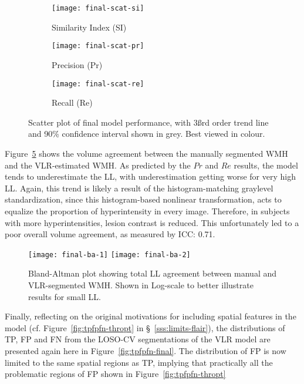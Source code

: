 \begin{figure}
  \centering
  \begin{subfigure}{0.32\textwidth}
    \centering
    \texttt{[image: final-scat-si]}
    \caption{Similarity Index (SI)}%
    \label{fig:seg-final-scat-si}
  \end{subfigure}
  \begin{subfigure}{0.32\textwidth}
    \centering
    \texttt{[image: final-scat-pr]}
    \caption{Precision (Pr)}%
    \label{fig:seg-final-scat-pr}
  \end{subfigure}
  \begin{subfigure}{0.32\textwidth}
    \centering
    \texttt{[image: final-scat-re]}
    \caption{Recall (Re)}%
    \label{fig:seg-final-scat-re}
  \end{subfigure}
  \caption{Scatter plot of final model performance, with 3\ss{rd} order trend line
    and 90\% confidence interval shown in grey. Best viewed in colour.}%
  \label{fig:seg-final-scat}
\end{figure}
Figure~\ref{fig:ba-final} shows the volume agreement between
the manually segmented WMH and the VLR-estimated WMH.
As predicted by the $Pr$ and $Re$ results, %
the model tends to underestimate the LL,
with underestimation getting worse for very high LL.
Again, this trend is likely a result of the histogram-matching graylevel standardization,
since this histogram-based nonlinear transformation,
acts to equalize the proportion of hyperintensity in every image.
Therefore, in subjects with more hyperintensities, lesion contrast is reduced.
This unfortunately led to a poor overall volume agreement, as measured by ICC: 0.71.
\par
\begin{figure}
  \centering
  \texttt{[image: final-ba-1]}
  \texttt{[image: final-ba-2]}
  \caption{Bland-Altman plot showing total LL agreement between manual and VLR-segmented WMH.
    Shown in Log-scale to better illustrate results for small LL.}%
  \label{fig:ba-final}
\end{figure}
Finally, reflecting on the original motivations for including spatial features in the model
(cf. Figure~\ref{fig:tpfpfn-thropt} in \S~\ref{sss:limits-flair}),
the distributions of TP, FP and FN from the LOSO-CV segmentations of the VLR model
are presented again here in Figure~\ref{fig:tpfpfn-final}.
The distribution of FP is now limited to the same spatial regions as TP,
implying that practically all the problematic regions of FP shown in Figure~\ref{fig:tpfpfn-thropt}
